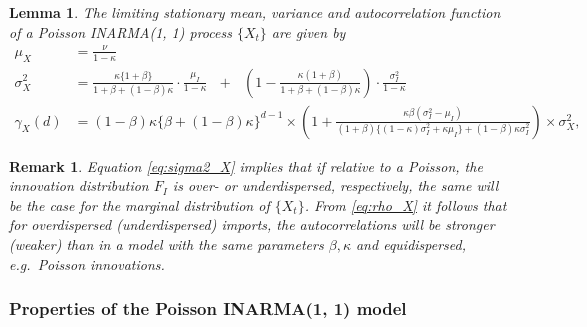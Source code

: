 \documentclass{article}
\newtheorem{lemma}{Lemma}
\newtheorem{remark}{Remark}
\begin{document}
\begin{lemma}
The limiting stationary mean, variance and autocorrelation function of a Poisson INARMA(1, 1) process $\{X_t\}$ are given by
\begin{align}
\mu_X & = \frac{\nu}{1 - \kappa}\label{eq:mu_X}\\
\sigma^2_X & = \frac{\kappa\{1 + \beta\}}{1 + \beta + (1 - \beta)\kappa} \cdot \frac{\mu_I}{1 - \kappa}\label{eq:sigma2_X}  \ \ \ + \ \ \  \left(1 - \frac{\kappa(1 + \beta)}{1 + \beta + (1 - \beta)\kappa}\right) \cdot \frac{\sigma^2_I}{1 - \kappa} \\  %
\gamma_X(d) & = (1 - \beta)\kappa\{\beta + (1 - \beta)\kappa\}^{d - 1} \times\left(1 + \frac{\kappa\beta(\sigma^2_I - \mu_I)}{(1 + \beta) \{(1 - \kappa)\sigma^2_I + \kappa\mu_I\} + (1 - \beta)\kappa\sigma^2_I}\right) \times \sigma^2_X,\label{eq:rho_X}
\end{align}
\end{lemma}

\begin{remark}
Equation \eqref{eq:sigma2_X} implies that if relative to a Poisson, the innovation distribution $F_I$ is over- or underdispersed, respectively, the same will be the case for the marginal distribution of $\{X_t\}$. From \eqref{eq:rho_X} it follows that for overdispersed (underdispersed) imports, the autocorrelations will be stronger (weaker) than in a model with the same parameters $\beta, \kappa$ and equidispersed, e.g.\ Poisson innovations.
\end{remark}


\subsubsection{Properties of the Poisson INARMA(1, 1) model}
\end{document}
